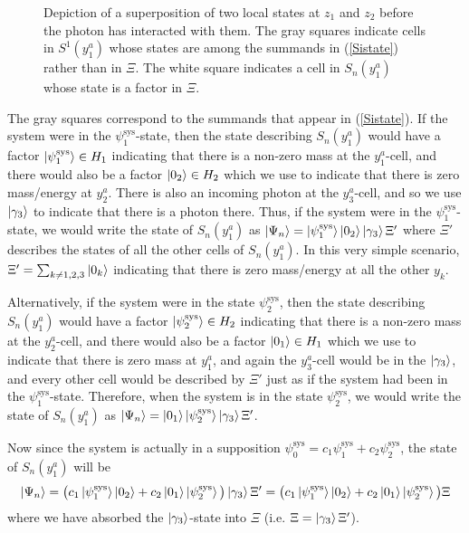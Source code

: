 \begin{figure}[ht!]

\vspace*{2px}
\caption{Depiction of a superposition of two local states at $z_1$ and $z_2$ before the photon has interacted with them. The gray squares indicate cells in $S^1(y^a_1)$ whose states are among the summands in (\ref{Sistate}) rather than in $\Xi$. The white square indicates a cell in $S_n(y^a_1)$ whose state is a factor in $\Xi$.}
\label{kentdeco1}
\end{figure}

The gray squares correspond to the summands that appear in (\ref{Sistate}). If the system were in the $\psi_1^\text{sys}$-state, then the state describing $S_n(y^a_1)$ would have a factor $\ket{\psi_1^\text{sys}}\in H_1$ indicating that there is a 
non-zero mass at the $y^a_1$-cell, and there would also be a factor $\ket{0_2}\in H_2$ which we use to indicate that there is zero mass/energy at $y^a_2$. 
There is also an incoming photon at the $y^a_3$-cell, and so we use $\ket{\gamma_3}$ to indicate that there is a photon there.
 Thus, if  the system  were in the $\psi_1^\text{sys}$-state, we would write the state of $S_n(y^a_1)$ 
 as $\ket{\Psi_n}=\ket{\psi_1^\text{sys}}\ket{0_2}\ket{\gamma_3}\Xi'$ where $\Xi'$ describes the states of all the other cells of $S_n(y^a_1)$. In this very simple scenario, $\Xi'=\sum_{k\neq 1,2,3}\ket{0_k}$ indicating that there is zero mass/energy at all the other $y_k$.

 Alternatively, if the system were in the state $\psi_2^\text{sys}$, then the state describing $S_n(y^a_1)$ would have a factor $\ket{\psi_2^\text{sys}}\in H_2$ 
 indicating that there is a non-zero mass at the $y^a_2$-cell, and there would also be a factor $\ket{0_1}\in H_1$ which we use to indicate that there is zero mass at $y^a_1$,
  and again the $y^a_3$-cell would be in the $\ket{\gamma_3}$, and every other cell would be described by  $\Xi'$  just as if the system had been in the $\psi_1^\text{sys}$-state. Therefore, when the system is in the state $\psi_2^\text{sys}$, we would write the state of $S_n(y^a_1)$ as $\ket{\Psi_n}=\ket{0_1}\ket{\psi_2^\text{sys}}\ket{\gamma_3}\Xi'$. 
 
 Now since the system is actually in a supposition $\psi_0^\text{sys} = c_1\psi_1^\text{sys}+c_2\psi_2^\text{sys}$, the state of $S_n(y^a_1)$ will be 
 \begin{equation*}
 \ket{\Psi_n}=\big(c_1\ket{\psi_1^\text{sys}}\ket{0_2}+c_2\ket{0_1}\ket{\psi_2^\text{sys}}\big)\ket{\gamma_3}\Xi'=\big(c_1\ket{\psi_1^\text{sys}}\ket{0_2}+c_2\ket{0_1}\ket{\psi_2^\text{sys}}\big)\Xi
 \end{equation*}
where we have absorbed the $\ket{\gamma_3}$-state into $\Xi$ (i.e. $\Xi= \ket{\gamma_3}\Xi'$).

